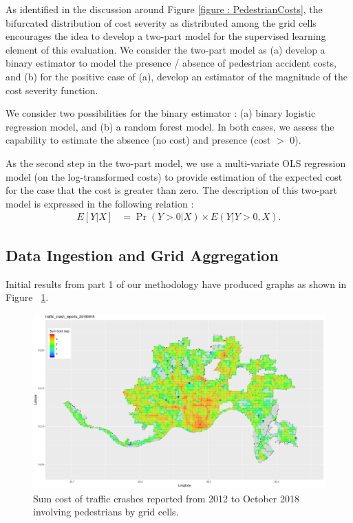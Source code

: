\documentclass{llncs}
\begin{document}
As identified in the discussion around Figure \ref{figure : PedestrianCosts}, the bifurcated distribution of cost severity as distributed among the grid cells encourages the idea to develop a two-part model for the supervised learning element of this evaluation. We consider the two-part model as (a) develop a binary estimator to model the presence / absence of pedestrian accident costs, and (b) for the positive case of (a), develop an estimator of the magnitude of the cost severity function.

We consider two possibilities for the binary estimator : (a) binary logistic regression model, and (b) a random forest model. In both cases, we assess the capability to estimate the absence (no cost) and presence (cost $>$ 0).

As the second step in the two-part model, we use a multi-variate OLS regression model (on the log-transformed costs) to provide estimation of the expected cost for the case that the cost is greater than zero. The description of this two-part model is expressed in the following relation : 
% 
\begin{align}
E[Y| X] &= \Pr(Y > 0 | X)\times E(Y | Y > 0,  X).
\end{align}


%
\subsection{Data Ingestion and Grid Aggregation}


Initial results from part 1 of our methodology have produced graphs as shown in Figure ~\ref{figure:SumCrashPlot}. \newline

\FloatBarrier
\begin{figure}
 	\includegraphics[width=\textwidth, height=\textheight, keepaspectratio]{trafficcrashreports20180918nonpedestriansumcostmapped2grid.png}
 	\caption{Sum cost of traffic crashes reported from 2012 to October 2018 involving pedestrians by grid cells.}
	\label{figure:SumCrashPlot}

\end{figure}
\FloatBarrier
\end{document}
